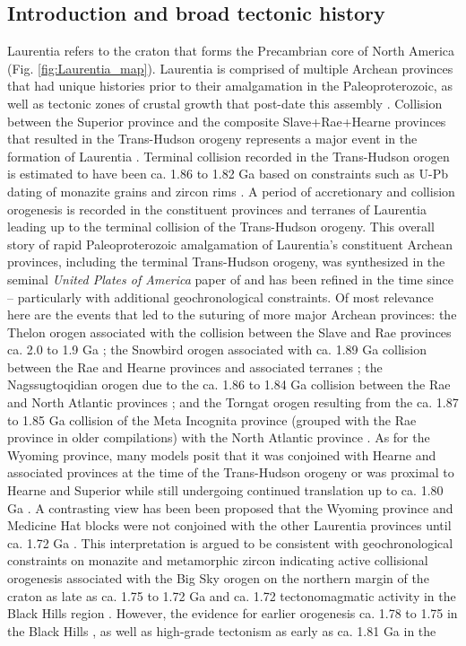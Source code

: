 \documentclass[11pt,letterpaper]{article}
\begin{document}
\subsection{Introduction and broad tectonic history}

Laurentia refers to the craton that forms the Precambrian core of North America (Fig. \ref{fig:Laurentia_map}). Laurentia is comprised of multiple Archean provinces that had unique histories prior to their amalgamation in the Paleoproterozoic, as well as tectonic zones of crustal growth that post-date this assembly \citep{Hoffman1989a, Whitmeyer2007a}. Collision between the Superior province and the composite Slave+Rae+Hearne provinces that resulted in the Trans-Hudson orogeny represents a major event in the formation of Laurentia \citep{Corrigan2009a}. Terminal collision recorded in the Trans-Hudson orogen is estimated to have been ca. 1.86 to 1.82 Ga based on constraints such as U-Pb dating of monazite grains and zircon rims \citep[e.g.]{Skipton2016a, Weller2017a}. A period of accretionary and collision orogenesis is recorded in the constituent provinces and terranes of Laurentia leading up to the terminal collision of the Trans-Hudson orogeny. This overall story of rapid Paleoproterozoic amalgamation of Laurentia's constituent Archean provinces, including the terminal Trans-Hudson orogeny, was synthesized in the seminal \textit{United Plates of America} paper of \citet{Hoffman1988a} and has been refined in the time since -- particularly with additional geochronological constraints. Of most relevance here are the events that led to the suturing of more major Archean provinces: the Thelon orogen associated with the collision between the Slave and Rae provinces ca. 2.0 to 1.9 Ga \citep{Hoffman1989a}; the Snowbird orogen associated with ca. 1.89 Ga collision between the Rae and Hearne provinces and associated terranes \citep{Berman2007a}; the Nagssugtoqidian orogen due to the ca. 1.86 to 1.84 Ga collision between the Rae and North Atlantic provinces \citep{St-Onge2009a}; and the Torngat orogen resulting from the ca. 1.87 to 1.85 Ga collision of the Meta Incognita province (grouped with the Rae province in older compilations) with the North Atlantic province \citep{St-Onge2009a}. As for the Wyoming province, many models posit that it was conjoined with Hearne and associated provinces at the time of the Trans-Hudson orogeny \citep[e.g.][]{St-Onge2009a, Pehrsson2015a} or was proximal to Hearne and Superior while still undergoing continued translation up to ca. 1.80 Ga \citep{Whitmeyer2007a}. A contrasting view has been been proposed that the Wyoming province and Medicine Hat blocks were not conjoined with the other Laurentia provinces until ca. 1.72 Ga \citep{Kilian2016b}. This interpretation is argued to be consistent with geochronological constraints on monazite and metamorphic zircon indicating active collisional orogenesis associated with the Big Sky orogen on the northern margin of the craton as late as ca. 1.75 to 1.72 Ga \citep{Condit2015a} and ca. 1.72 tectonomagmatic activity in the Black Hills region \citep{Redden1990a}. However, the evidence for earlier orogenesis ca. 1.78 to 1.75 in the Black Hills \citep{Dahl1999a,Hrncir2017a}, as well as high-grade tectonism as early as ca. 1.81 Ga in the 
\end{document}
